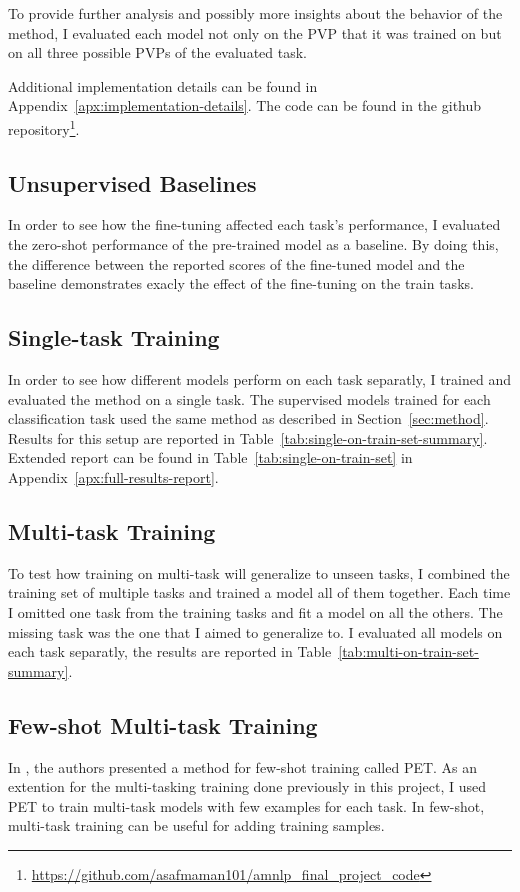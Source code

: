 \documentclass[11pt,a4paper]{article}
\begin{document}
To provide further analysis and possibly more insights about the behavior of the method, I evaluated each model not only on the PVP that it was trained on but on all three possible PVPs of the evaluated task.

Additional implementation details can be found in Appendix~\ref{apx:implementation-details}.
The code can be found in the github repository\footnote{\url{https://github.com/asafmaman101/amnlp_final_project_code}}.

\subsection{Unsupervised Baselines}
In order to see how the fine-tuning affected each task's performance, I evaluated the zero-shot performance of the pre-trained model as a baseline.
By doing this, the difference between the reported scores of the fine-tuned model and the baseline demonstrates exacly the effect of the fine-tuning on the train tasks.

\subsection{Single-task Training}
In order to see how different models perform on each task separatly, I trained and evaluated the method on a single task.
The supervised models trained for each classification task used the same method as described in Section~\ref{sec:method}.
Results for this setup are reported in Table~\ref{tab:single-on-train-set-summary}.
Extended report can be found in Table~\ref{tab:single-on-train-set} in Appendix~\ref{apx:full-results-report}.

\subsection{Multi-task Training}
To test how training on multi-task will generalize to unseen tasks, I combined the training set of multiple tasks and trained a model all of them together.
Each time I omitted one task from the training tasks and fit a model on all the others.
The missing task was the one that I aimed to generalize to.
I evaluated all models on each task separatly, the results are reported in Table~\ref{tab:multi-on-train-set-summary}.

\subsection{Few-shot Multi-task Training}
In \citet{schick2020exploiting}, the authors presented a method for few-shot training called PET.
As an extention for the multi-tasking training done previously in this project, I used PET to train multi-task models with few examples for each task.
In few-shot, multi-task training can be useful for adding training samples.
\end{document}
